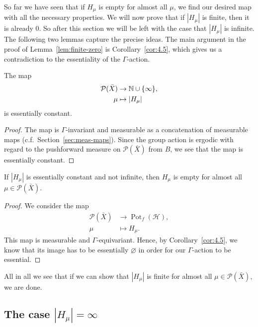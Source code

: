 So far we have seen that if \(H_\mu\) is empty for almost all \(\mu\), we find our desired map with all the necessary properties. We will now prove that if \(|H_\mu|\) is finite, then it is already 0. So after this section we will be left with the case that \(|H_\mu|\) is infinite. The following two lemmas capture the precise ideas. The main argument in the proof of Lemma~\ref{lem:finite-zero} is Corollary~\ref{cor:4.5}, which gives us a contradiction to the essentiality of the \(\Gamma\)-action.

\begin{lemma}
  \label{lem:h-const}
  The map
  \begin{align*}
    \mathcal{P}(\bar X) &\to \mathbb{N} \cup \{\infty\},\\
    \mu &\mapsto |H_\mu|
  \end{align*}
  is essentially constant.
\end{lemma}

\begin{proof}
  The map is \(\Gamma\)-invariant and measurable as a concatenation of measurable maps (c.f.~Section~\ref{sec:meas-maps}). Since the group action is ergodic with regard to the pushforward measure on \(\mathcal{P}(\bar X)\) from \(B\), we see that the map is essentially constant.
\end{proof}

\begin{lemma}
  \label{lem:finite-zero}
  If \(|H_\mu|\) is essentially constant and not infinite, then \(H_\mu\) is empty for almost all \(\mu \in \mathcal{P}(\bar X)\).
\end{lemma}

\begin{proof}
  We consider the map
  \begin{align*}
    \mathcal{P}(\bar X) & \to \operatorname{Pot}_f(\mathcal{H}),\\
    \mu & \mapsto H_\mu.
  \end{align*}
  This map is measurable and \(\Gamma\)-equivariant. Hence, by Corollary~\ref{cor:4.5}, we know that its image has to be essentially \(\varnothing\) in order for our \(\Gamma\)-action to be essential.
\end{proof}

All in all we see that if we can show that \(|H_\mu|\) is finite for almost all \(\mu \in \mathcal{P}(\bar X)\), we are done. 

\subsection{The case \(|H_\mu| = \infty\)}
\label{sec:N=infty}

